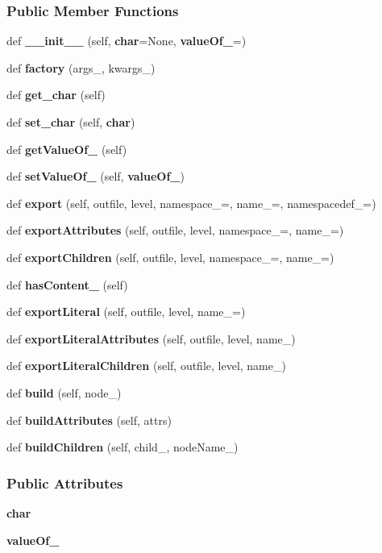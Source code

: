 \subsubsection*{Public Member Functions}
\begin{DoxyCompactItemize}
\item 
def {\bf \+\_\+\+\_\+init\+\_\+\+\_\+} (self, {\bf char}=None, {\bf value\+Of\+\_\+}=\textquotesingle{}\textquotesingle{})
\item 
def {\bf factory} (args\+\_\+, kwargs\+\_\+)
\item 
def {\bf get\+\_\+char} (self)
\item 
def {\bf set\+\_\+char} (self, {\bf char})
\item 
def {\bf get\+Value\+Of\+\_\+} (self)
\item 
def {\bf set\+Value\+Of\+\_\+} (self, {\bf value\+Of\+\_\+})
\item 
def {\bf export} (self, outfile, level, namespace\+\_\+=\textquotesingle{}\textquotesingle{}, name\+\_\+=\textquotesingle{}, namespacedef\+\_\+=\textquotesingle{}\textquotesingle{})
\item 
def {\bf export\+Attributes} (self, outfile, level, namespace\+\_\+=\textquotesingle{}\textquotesingle{}, name\+\_\+=\textquotesingle{})
\item 
def {\bf export\+Children} (self, outfile, level, namespace\+\_\+=\textquotesingle{}\textquotesingle{}, name\+\_\+=\textquotesingle{})
\item 
def {\bf has\+Content\+\_\+} (self)
\item 
def {\bf export\+Literal} (self, outfile, level, name\+\_\+=\textquotesingle{})
\item 
def {\bf export\+Literal\+Attributes} (self, outfile, level, name\+\_\+)
\item 
def {\bf export\+Literal\+Children} (self, outfile, level, name\+\_\+)
\item 
def {\bf build} (self, node\+\_\+)
\item 
def {\bf build\+Attributes} (self, attrs)
\item 
def {\bf build\+Children} (self, child\+\_\+, node\+Name\+\_\+)
\end{DoxyCompactItemize}
\subsubsection*{Public Attributes}
\begin{DoxyCompactItemize}
\item 
{\bf char}
\item 
{\bf value\+Of\+\_\+}
\end{DoxyCompactItemize}
